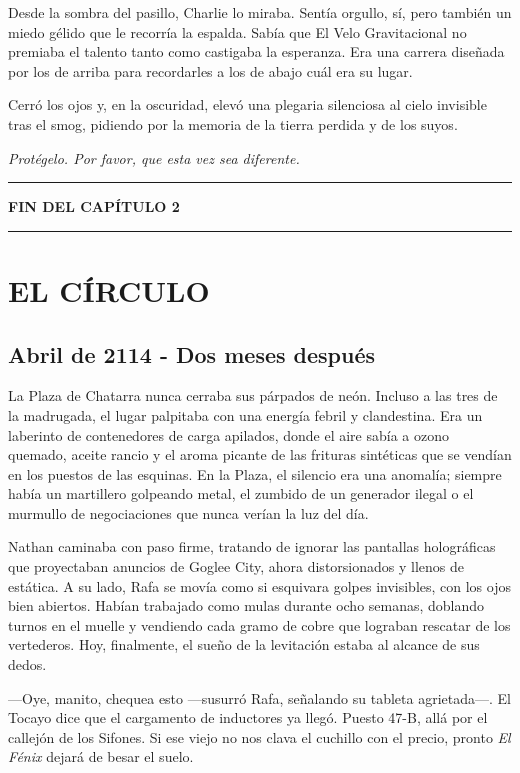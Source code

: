 \documentclass[12pt,a4paper]{book}
\begin{document}
Desde la sombra del pasillo, Charlie lo miraba. Sentía orgullo, sí, pero también un miedo gélido que le recorría la espalda. Sabía que El Velo Gravitacional no premiaba el talento tanto como castigaba la esperanza. Era una carrera diseñada por los de arriba para recordarles a los de abajo cuál era su lugar.

Cerró los ojos y, en la oscuridad, elevó una plegaria silenciosa al cielo invisible tras el smog, pidiendo por la memoria de la tierra perdida y de los suyos.

\textit{Protégelo. Por favor, que esta vez sea diferente.}

\bigskip
\noindent\rule{\textwidth}{0.4pt}
\bigskip

\textbf{FIN DEL CAPÍTULO 2}


\bigskip
\noindent\rule{\textwidth}{0.4pt}
\bigskip

\chapter{EL CÍRCULO}

\section*{Abril de 2114 - Dos meses después}

La Plaza de Chatarra nunca cerraba sus párpados de neón. Incluso a las tres de la madrugada, el lugar palpitaba con una energía febril y clandestina. Era un laberinto de contenedores de carga apilados, donde el aire sabía a ozono quemado, aceite rancio y el aroma picante de las frituras sintéticas que se vendían en los puestos de las esquinas. En la Plaza, el silencio era una anomalía; siempre había un martillero golpeando metal, el zumbido de un generador ilegal o el murmullo de negociaciones que nunca verían la luz del día.

Nathan caminaba con paso firme, tratando de ignorar las pantallas holográficas que proyectaban anuncios de Goglee City, ahora distorsionados y llenos de estática. A su lado, Rafa se movía como si esquivara golpes invisibles, con los ojos bien abiertos. Habían trabajado como mulas durante ocho semanas, doblando turnos en el muelle y vendiendo cada gramo de cobre que lograban rescatar de los vertederos. Hoy, finalmente, el sueño de la levitación estaba al alcance de sus dedos.

---Oye, manito, chequea esto ---susurró Rafa, señalando su tableta agrietada---. El Tocayo dice que el cargamento de inductores ya llegó. Puesto 47-B, allá por el callejón de los Sifones. Si ese viejo no nos clava el cuchillo con el precio, pronto \textit{El Fénix} dejará de besar el suelo.
\end{document}
